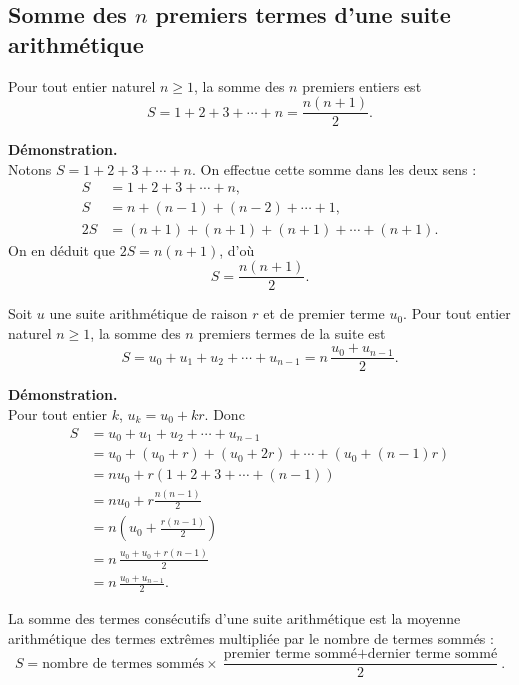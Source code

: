 \documentclass[11pt]{article}
\newenvironment{demonstration}{\par\smallskip\noindent\textbf{Démonstration. \\}\ignorespaces}{\par\smallskip}
\begin{document}
\subsection{Somme des $n$ premiers termes d'une suite arithmétique}

\begin{propriete}
Pour tout entier naturel $n\geq 1$, la somme des $n$ premiers entiers est
\[
S=1+2+3+\cdots+n=\frac{n(n+1)}{2}.
\]
\end{propriete}

\begin{demonstration}
Notons $S=1+2+3+\cdots+n$. On effectue cette somme dans les deux sens :
\begin{align*}
S&=1+2+3+\cdots+n,\\
S&=n+(n-1)+(n-2)+\cdots+1,\\
2S&=(n+1)+(n+1)+(n+1)+\cdots+(n+1).
\end{align*}
On en déduit que $2S=n(n+1)$, d'où
\[
S=\frac{n(n+1)}{2}.
\]
\end{demonstration}

\begin{propriete}
Soit $u$ une suite arithmétique de raison $r$ et de premier terme $u_0$. Pour tout entier naturel $n\geq 1$, la somme des $n$ premiers termes de la suite est
\[
S=u_0+u_1+u_2+\cdots+u_{n-1}=n\,\frac{u_0+u_{n-1}}{2}.
\]
\end{propriete}

\begin{demonstration}
Pour tout entier $k$, $u_k=u_0+kr$. Donc
\begin{align*}
S&=u_0+u_1+u_2+\cdots+u_{n-1}\\
 &=u_0+(u_0+r)+(u_0+2r)+\cdots+(u_0+(n-1)r)\\
 &=nu_0+r(1+2+3+\cdots+(n-1))\\
 &=nu_0+r\frac{n(n-1)}{2}\\
 &=n\left(u_0+\frac{r(n-1)}{2}\right)\\
 &=n\,\frac{u_0+u_0+r(n-1)}{2}\\
 &=n\,\frac{u_0+u_{n-1}}{2}.
\end{align*}
\end{demonstration}

\begin{theoreme}
La somme des termes consécutifs d'une suite arithmétique est la moyenne arithmétique des termes extrêmes multipliée par le nombre de termes sommés :
\[
S=\text{nombre de termes sommés}\times
\frac{\text{premier terme sommé}+\text{dernier terme sommé}}{2}.
\]
\end{theoreme}
\end{document}
